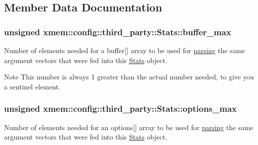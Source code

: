 \subsection{Member Data Documentation}
\hypertarget{structxmem_1_1config_1_1third__party_1_1_stats_a42c3ec9a6baf2c24d783b00279266298}{
\subsubsection[{buffer\-\_\-max}]{\setlength{\rightskip}{0pt plus 5cm}unsigned xmem\-::config\-::third\-\_\-party\-::\-Stats\-::buffer\-\_\-max}}\label{structxmem_1_1config_1_1third__party_1_1_stats_a42c3ec9a6baf2c24d783b00279266298}


Number of elements needed for a {\ttfamily buffer}\mbox{[}\mbox{]} array to be used for \hyperlink{classxmem_1_1config_1_1third__party_1_1_parser_a0e45d97675bc5d003ef6f68ac8cd7249}{parsing} the same argument vectors that were fed into this \hyperlink{structxmem_1_1config_1_1third__party_1_1_stats}{Stats} object. 

\begin{DoxyNote}{Note}
This number is always 1 greater than the actual number needed, to give you a sentinel element. 
\end{DoxyNote}
\hypertarget{structxmem_1_1config_1_1third__party_1_1_stats_a74f645c06ae7eab5058f2a51226c2dcd}{
\subsubsection[{options\-\_\-max}]{\setlength{\rightskip}{0pt plus 5cm}unsigned xmem\-::config\-::third\-\_\-party\-::\-Stats\-::options\-\_\-max}}\label{structxmem_1_1config_1_1third__party_1_1_stats_a74f645c06ae7eab5058f2a51226c2dcd}


Number of elements needed for an {\ttfamily options}\mbox{[}\mbox{]} array to be used for \hyperlink{classxmem_1_1config_1_1third__party_1_1_parser_a0e45d97675bc5d003ef6f68ac8cd7249}{parsing} the same argument vectors that were fed into this \hyperlink{structxmem_1_1config_1_1third__party_1_1_stats}{Stats} object. 

